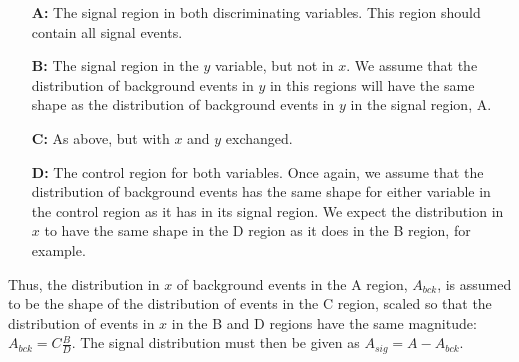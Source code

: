 \begin{itemize}
\item[{\bfseries\sffamily\color{natgreen}A:}] The signal region in both discriminating variables. This region should contain all signal events.
\item[{\bfseries\sffamily\color{natgreen}B:}] The signal region in the $y$ variable, but not in $x$. We assume that the distribution of background events in $y$ in this regions will have the same shape as the distribution of background events in $y$ in the signal region, A.
\item[{\bfseries\sffamily\color{natgreen}C:}] As above, but with $x$ and $y$ exchanged.
\item[{\bfseries\sffamily\color{natgreen}D:}] The control region for both variables. Once again, we assume that the distribution of background events has the same shape for either variable in the control region as it has in its signal region. We expect the distribution in $x$ to have the same shape in the D region as it does in the B region, for example.
\end{itemize}

Thus, the distribution in $x$ of background events in the A region, $A_{bck}$, is assumed to be the shape of the distribution of events in the C region, scaled so that the distribution of events in $x$ in the B and D regions have the same magnitude:
\(A_{bck}=C\frac BD.\label{abckfind}\)
The signal distribution must then be given as
\(A_{sig}=A-A_{bck}.\label{asig}\)

